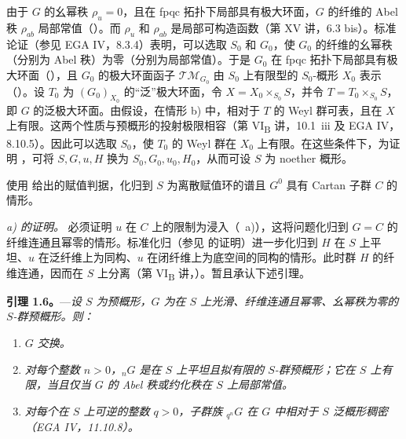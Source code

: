 由于 \(G\) 的幺幂秩 \(\rho_u=0\)，且在 fpqc 拓扑下局部具有极大环面，\(G\) 的纤维的 Abel 秩 \(\rho_{ab}\) 局部常值（）。而 \(\rho_u\) 和 \(\rho_{ab}\) 是局部可构造函数（第 XV 讲，6.3 bis）。标准论证（参见 EGA IV，8.3.4）表明，可以选取 \(S_0\) 和 \(G_0\)，使 \(G_0\) 的纤维的幺幂秩（分别为 Abel 秩）为零（分别为局部常值）。于是 \(G_0\) 在 fpqc 拓扑下局部具有极大环面（），且 \(G_0\) 的极大环面函子 \(\mathcal{TM}_{G_0}\) 由 \(S_0\) 上有限型的 \(S_0\)-概形 \(X_0\) 表示（）。设 \(T_0\) 为 \((G_0)_{X_0}\) 的“泛”极大环面，令 \(X=X_0\times_{S_0}S\)，并令 \(T=T_0\times_{S_0}S\)，即 \(G\) 的泛极大环面。由假设，在情形 b) 中，相对于 \(T\) 的 Weyl 群可表，且在 \(X\) 上有限。这两个性质与预概形的投射极限相容（第 VI\textsubscript{B} 讲，10.1~iii 及 EGA IV，8.10.5）。因此可以选取 \(S_0\)，使 \(T_0\) 的 Weyl 群在 \(X_0\) 上有限。在这些条件下，为证明 ，可将 \(S,G,u,H\) 换为 \(S_0,G_0,u_0,H_0\)，从而可设 \(S\) 为 noether 概形。

使用  给出的赋值判据，化归到 \(S\) 为离散赋值环的谱且 \(G^0\) 具有 Cartan 子群 \(C\) 的情形。

\smallskip
\noindent\textit{ a) 的证明。}
必须证明 \(u\) 在 \(C\) 上的限制为浸入（~a)），这将问题化归到 \(G=C\) 的纤维连通且幂零的情形。标准化归（参见 的证明）进一步化归到 \(H\) 在 \(S\) 上平坦、\(u\) 在泛纤维上为同构、\(u\) 在闭纤维上为底空间的同构的情形。此时群 \(H\) 的纤维连通，因而在 \(S\) 上分离（第 VI\textsubscript{B} 讲，）。暂且承认下述引理。

\medskip
\noindent{}%
\textbf{引理 1.6。}---\textit{设 \(S\) 为预概形，\(G\) 为在 \(S\) 上光滑、纤维连通且幂零、幺幂秩为零的 \(S\)-群预概形。则：}
\begin{enumerate}
\item[\textit{i)}] \textit{\(G\) 交换。}
\item[\textit{ii)}] \textit{对每个整数 \(n>0\)，\({}_{n}G\) 是在 \(S\) 上平坦且拟有限的 \(S\)-群预概形；它在 \(S\) 上有限，当且仅当 \(G\) 的 Abel 秩或约化秩在 \(S\) 上局部常值。}
\item[\textit{iii)}] \textit{对每个在 \(S\) 上可逆的整数 \(q>0\)，子群族 \({}_{q^n}G\) 在 \(G\) 中相对于 \(S\) 泛概形稠密（EGA IV，11.10.8）。}
\end{enumerate}

